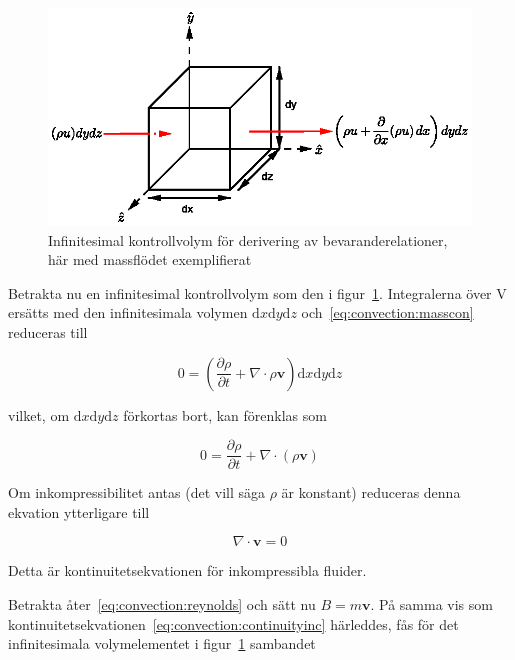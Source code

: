 \begin{figure}[hpbt]\centering
\includegraphics[scale=1]{images/massflowcube.eps}
\caption{Infinitesimal kontrollvolym för derivering av bevaranderelationer, här med massflödet exemplifierat}
\label{fig:massflowcube}
\end{figure}

Betrakta nu en infinitesimal kontrollvolym som den i figur~\ref{fig:massflowcube}. Integralerna över V ersätts med den infinitesimala volymen $\mathrm{d}x\mathrm{d}y\mathrm{d}z$ och~\eqref{eq:convection:masscon} reduceras till

\begin{equation}
\label{eq:convection:massconinf}
0 = \left( \frac{\partial \rho}{\partial t} + \nabla \cdot \rho \mathbf{v}\right) \mathrm{d}x\mathrm{d}y\mathrm{d}z
\end{equation}

vilket, om $\mathrm{d}x\mathrm{d}y\mathrm{d}z$ förkortas bort, kan förenklas som

\begin{equation}
\label{eq:convection:continuity}
\boxed{ \; \; \;
0 = \frac{\partial \rho}{\partial t} + \nabla \cdot \left( \rho \mathbf{v} \right) 
\; \; \; }
\end{equation}

Om inkompressibilitet antas (det vill säga $\rho$ är konstant) reduceras denna ekvation ytterligare till

\begin{equation}
\label{eq:convection:continuityinc}
\nabla \cdot \mathbf{v} = 0
\end{equation}

Detta är kontinuitetsekvationen för inkompressibla fluider.

Betrakta åter~\eqref{eq:convection:reynolds} och sätt nu $B = m\mathbf{v}$. På samma vis som kontinuitetsekvationen~\eqref{eq:convection:continuityinc} härleddes, fås för det infinitesimala volymelementet i figur~\ref{fig:massflowcube} sambandet

